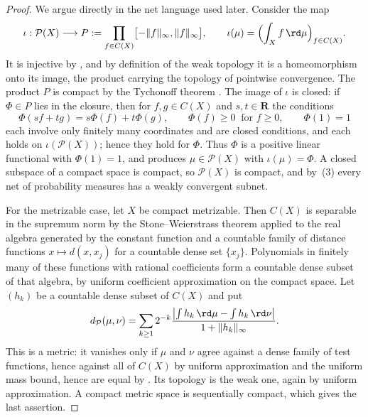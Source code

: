 \begin{proof}
We argue directly in the net language used later.
Consider the map
\[
 \iota:\mathcal P(X)\longrightarrow
 P:=\prod_{f\in C(X)}\bigl[-\lVert f\rVert_\infty,\lVert f\rVert_\infty\bigr],
 \qquad
 \iota(\mu)=\Bigl(\int_Xf\,\rd\mu\Bigr)_{f\in C(X)} .
\]
It is injective by , and by definition of the weak
topology it is a homeomorphism onto its image, the product carrying the
topology of pointwise convergence.  The product $P$ is compact by the
Tychonoff theorem \cite[Chapter~5]{Kel75}.  The image of $\iota$ is closed:
if $\Phi\in P$ lies in the closure, then for $f,g\in C(X)$ and
$s,t\in\mathbf R$ the conditions
\[
 \Phi(sf+tg)=s\Phi(f)+t\Phi(g),
 \qquad
 \Phi(f)\geq0\ \text{ for }f\geq0,
 \qquad
 \Phi(1)=1
\]
each involve only finitely many coordinates and are closed conditions, and
each holds on $\iota(\mathcal P(X))$; hence they hold for $\Phi$.  Thus $\Phi$
is a positive linear functional with $\Phi(1)=1$, and
 produces $\mu\in\mathcal P(X)$ with
$\iota(\mu)=\Phi$.  A closed subspace of a compact space is compact, so
$\mathcal P(X)$ is compact, and by \,(3) every net of
probability measures has a weakly convergent subnet.

For the metrizable case, let $X$ be compact metrizable.  Then $C(X)$ is
separable in the supremum norm by the Stone--Weierstrass theorem applied to
the real algebra generated by the constant function and a countable family
of distance functions $x\mapsto d(x,x_j)$ for a countable dense set
$\{x_j\}$.  Polynomials in finitely many of these functions with rational
coefficients form a countable dense subset of that algebra, by uniform
coefficient approximation on the compact space.  Let $(h_k)$ be a
countable dense subset of $C(X)$ and put
\[
 d_{\mathcal P}(\mu,\nu)
 =\sum_{k\geq1}2^{-k}
 \frac{\bigl|\int h_k\,\rd\mu-\int h_k\,\rd\nu\bigr|}
      {1+\lVert h_k\rVert_\infty}.
\]
This is a metric: it vanishes only if $\mu$ and $\nu$ agree against a dense
family of test functions, hence against all of $C(X)$ by uniform
approximation and the uniform mass bound, hence are equal by
.  Its topology is the weak one, again by uniform
approximation.  A compact metric space is sequentially compact, which gives
the last assertion.
\end{proof}

